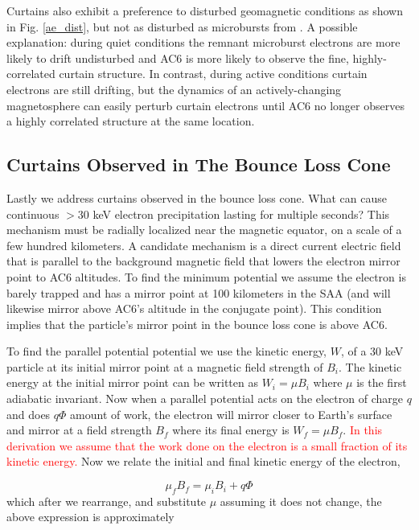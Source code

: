 \documentclass[draft]{agujournal2019}
\begin{document}
Curtains also exhibit a preference to disturbed geomagnetic conditions as shown in Fig. \ref{ae_dist}, but not as disturbed as microbursts from . A possible explanation: during quiet conditions the remnant microburst electrons are more likely to drift undisturbed and AC6 is more likely to observe the fine, highly-correlated curtain structure. In contrast, during active conditions curtain electrons are still drifting, but the dynamics of an actively-changing magnetosphere can easily perturb curtain electrons until AC6 no longer observes a highly correlated structure at the same location.
 
\subsection{Curtains Observed in The Bounce Loss Cone}
Lastly we address curtains observed in the bounce loss cone. What can cause continuous $>30$ keV electron precipitation lasting for multiple seconds? This mechanism must be radially localized near the magnetic equator, on a scale of a few hundred kilometers. A candidate mechanism is a direct current electric field that is parallel to the background magnetic field that lowers the electron mirror point to AC6 altitudes. To find the minimum potential we assume the electron is barely trapped and has a mirror point at 100 kilometers in the SAA (and will likewise mirror above AC6's altitude in the conjugate point). This condition implies that the particle's mirror point in the bounce loss cone is above AC6. 

To find the parallel potential potential we use the kinetic energy, $W$, of a $30$ keV particle at its initial mirror point at a magnetic field strength of $B_i$. The kinetic energy at the initial mirror point can be written as $W_i = \mu B_i$ where $\mu$ is the first adiabatic invariant. Now when a parallel potential acts on the electron of charge $q$ and does $q \Phi$ amount of work, the electron will mirror closer to Earth's surface and mirror at a field strength $B_f$ where its final energy is $W_f = \mu B_f$. \textcolor{red}{In this derivation we assume that the work done on the electron is a small fraction of its kinetic energy.} Now we relate the initial and final kinetic energy of the electron,

\begin{equation}
\mu_f B_f = \mu_i B_i + q \Phi
\end{equation} which after we rearrange, and substitute $\mu$ assuming it does not change, the above expression is approximately
\end{document}
